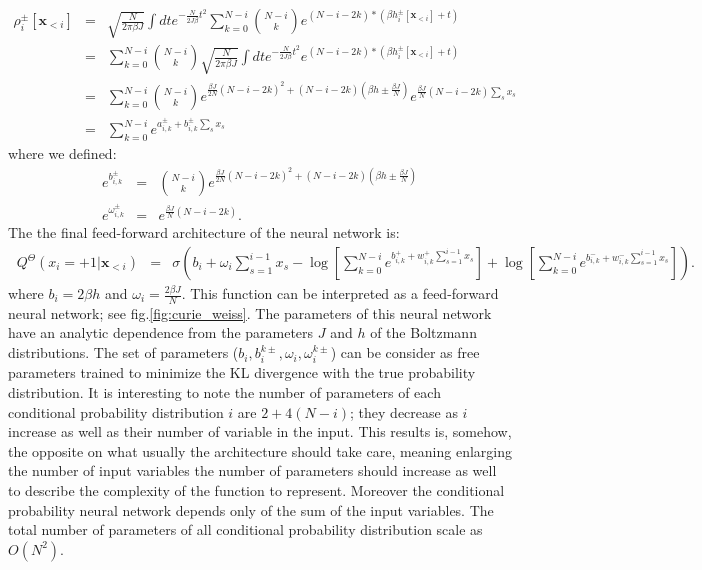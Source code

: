 \documentclass{article}
\begin{document}
 \begin{eqnarray*}
 \rho_i^{\pm}[\mathbf{x}_{<i}] &=& \sqrt{\frac{N}{2\pi \beta J}}\int dt e^{-\frac{N}{2J \beta}t^{2}} 
 \sum_{k=0}^{N-i} \binom{N-i}{k} e^{(N-i-2k)*(\beta h_i^{\pm}[\mathbf{x}_{<i}] + t)}\\
 &=& \sum_{k=0}^{N-i} \binom{N-i}{k} \sqrt{\frac{N}{2\pi \beta J}}\int dt e^{-\frac{N}{2J \beta}t^{2}} 
  e^{(N-i-2k)*(\beta h_i^{\pm}[\mathbf{x}_{<i}] + t)}\\
&=& \sum_{k=0}^{N-i} \binom{N-i}{k}e^{\frac{\beta J}{2N}\left(N-i-2k\right)^{2}+\left(N-i-2k\right)\left(\beta h \pm \frac{\beta J}{N}\right)} e^{\frac{\beta J}{N}\left(N-i-2k\right) \sum_s x_s} \\
&=& \sum_{k=0}^{N-i} e^{a_{i,k}^{\pm} + b_{i,k}^{\pm} \sum_s x_s} 
\end{eqnarray*}
where we defined:
\begin{eqnarray}
\label{eq:params}
e^{b_{i,k}^{\pm}} & = & \binom{N-i}{k}e^{\frac{\beta J}{2N}\left(N-i-2k\right)^{2}+\left(N-i-2k\right)\left(\beta h \pm \frac{\beta J}{N}\right)}\\
e^{\omega_{i,k}^{\pm}} & = & e^{\frac{\beta J}{N}\left(N-i-2k\right)}.
\end{eqnarray}
The the final feed-forward architecture of the neural network is:
\begin{eqnarray}\
\label{eq:curie_weiss_cond}
Q^{\Theta}\left(x_{i}=+1|\mathbf{x}_{<i}\right) & = &  \sigma \left(b_{i}+\omega_{i}\sum_{s=1}^{i-1}x_{s}-\log\left[\sum_{k=0}^{N-i}e^{b_{i,k}^{+}+w_{i,k}^{+}\sum_{s=1}^{i-1}x_{s}}\right]+\log\left[\sum_{k=0}^{N-i}e^{b_{i,k}^{-} + w_{i,k}^{-}\sum_{s=1}^{i-1}x_{s}}\right]\right).
\end{eqnarray}
where $b_i=2\beta h$ and $\omega_i=\frac{2\beta J}{N}$. 
\newline
This function can be interpreted as a feed-forward neural network; see fig.\ref{fig:curie_weiss}. 
The parameters of this neural network have an analytic dependence from the parameters $J$ and $h$ of the Boltzmann distributions. 
The set of parameters ($b_i, b_i^{k\pm}, \omega_i, \omega_i^{k\pm}$) can be consider as free parameters trained to minimize the KL divergence with the true probability distribution. 
It is interesting to note the number of parameters of each conditional probability distribution $i$ are $2+4(N-i)$; they decrease as $i$ increase as well as their number of variable in the input. This results is, somehow, the opposite on what usually the architecture should take care, meaning enlarging the number of input variables the number of parameters should increase as well to describe the complexity of the function to represent. Moreover the conditional probability neural network depends only of the sum of the input variables.
The total number of parameters of all conditional probability distribution scale as $O(N^2)$. 
\end{document}

